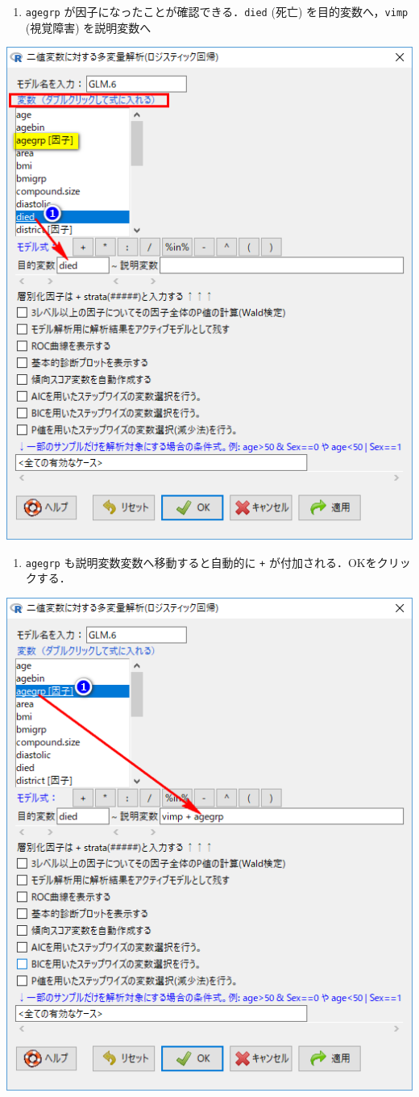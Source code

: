 \documentclass[]{problemset}
\providecommand{\tightlist}{%
  \setlength{\itemsep}{0pt}\setlength{\parskip}{0pt}}
\begin{document}
\begin{enumerate}
\def\labelenumi{\arabic{enumi}.}
\setcounter{enumi}{1}
\tightlist
\item
  \texttt{agegrp} が因子になったことが確認できる．\newline \texttt{died}
  (死亡) を目的変数へ，\texttt{vimp} (視覚障害) を説明変数へ
\end{enumerate}

\begin{center}\includegraphics[width=0.5\linewidth,height=0.5\textheight]{pic/mltlogstic05} \end{center}

\begin{enumerate}
\def\labelenumi{\arabic{enumi}.}
\setcounter{enumi}{2}
\tightlist
\item
  \texttt{agegrp} も説明変数変数へ移動すると自動的に \texttt{+}
  が付加される．OKをクリックする．
\end{enumerate}

\begin{center}\includegraphics[width=0.5\linewidth,height=0.5\textheight]{pic/mltlogstic06} \end{center}
\end{document}
